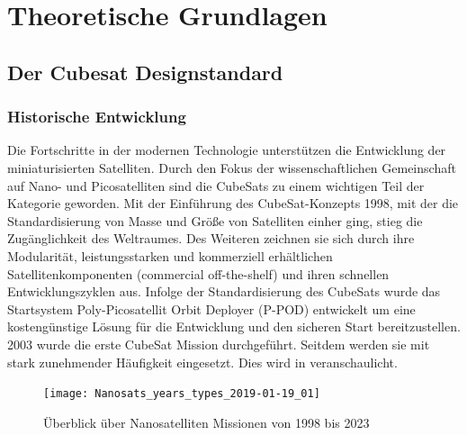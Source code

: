 \chapter{Theoretische Grundlagen}
\section{Der Cubesat Designstandard}%
	\subsection{Historische Entwicklung}
Die Fortschritte in der modernen Technologie unterstützen die Entwicklung der miniaturisierten Satelliten. Durch den Fokus der wissenschaftlichen Gemeinschaft auf Nano- und Picosatelliten sind die CubeSats zu einem wichtigen Teil der Kategorie geworden. Mit der Einführung des CubeSat-Konzepts 1998, mit der die Standardisierung von Masse und Größe von Satelliten einher ging, stieg die Zugänglichkeit des Weltraumes. Des Weiteren zeichnen sie sich durch ihre Modularität, leistungsstarken und kommerziell erhältlichen Satellitenkomponenten (commercial off-the-shelf) und ihren schnellen Entwicklungszyklen aus. Infolge der Standardisierung des CubeSats wurde das Startsystem Poly-Picosatellit Orbit Deployer (P-POD) entwickelt um eine kostengünstige Lösung für die Entwicklung und den sicheren Start bereitzustellen. \cite[S. 1 - 4]{RahmatSamii.2017} \\ 
2003 wurde die erste CubeSat Mission durchgeführt. Seitdem werden sie mit stark zunehmender Häufigkeit eingesetzt. Dies wird in  veranschaulicht. \cite[S. 1]{firstone}
			\begin{figure}[h]
				\centering
					\texttt{[image: Nanosats\_years\_types\_2019-01-19\_01]}
				\caption{Überblick über Nanosatelliten Missionen von 1998 bis 2023}
				\label{fig:NanosatsTypes}
			\end{figure}

	\newpage
